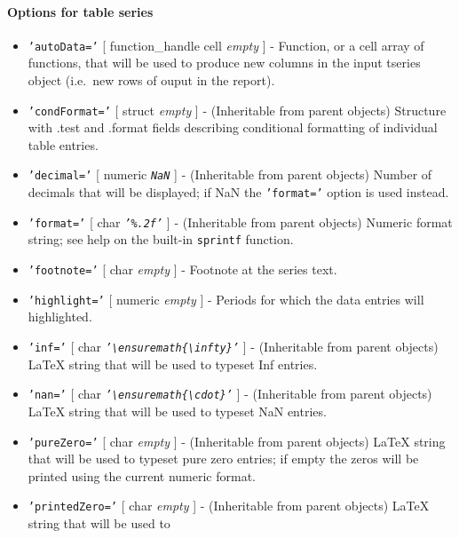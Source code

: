 \paragraph{Options for table series}\label{options-for-table-series}

\begin{itemize}
\item
  \texttt{'autoData='} {[} function\_handle \textbar{} cell \textbar{}
  \emph{empty} {]} - Function, or a cell array of functions, that will
  be used to produce new columns in the input tseries object (i.e.~new
  rows of ouput in the report).
\item
  \texttt{'condFormat='} {[} struct \textbar{} \emph{empty} {]} -
  (Inheritable from parent objects) Structure with .test and .format
  fields describing conditional formatting of individual table entries.
\item
  \texttt{'decimal='} {[} numeric \textbar{} \emph{\texttt{NaN}} {]} -
  (Inheritable from parent objects) Number of decimals that will be
  displayed; if NaN the \texttt{'format='} option is used instead.
\item
  \texttt{'format='} {[} char \textbar{} \emph{\texttt{'\%.2f'}} {]} -
  (Inheritable from parent objects) Numeric format string; see help on
  the built-in \texttt{sprintf} function.
\item
  \texttt{'footnote='} {[} char \textbar{} \emph{empty} {]} - Footnote
  at the series text.
\item
  \texttt{'highlight='} {[} numeric \textbar{} \emph{empty} {]} -
  Periods for which the data entries will highlighted.
\item
  \texttt{'inf='} {[} char \textbar{}
  \emph{\texttt{'\textbackslash{}ensuremath\{\textbackslash{}infty\}'}}
  {]} - (Inheritable from parent objects) LaTeX string that will be used
  to typeset Inf entries.
\item
  \texttt{'nan='} {[} char \textbar{}
  \emph{\texttt{'\textbackslash{}ensuremath\{\textbackslash{}cdot\}'}}
  {]} - (Inheritable from parent objects) LaTeX string that will be used
  to typeset NaN entries.
\item
  \texttt{'pureZero='} {[} char \textbar{} \emph{empty} {]} -
  (Inheritable from parent objects) LaTeX string that will be used to
  typeset pure zero entries; if empty the zeros will be printed using
  the current numeric format.
\item
  \texttt{'printedZero='} {[} char \textbar{} \emph{empty} {]} -
  (Inheritable from parent objects) LaTeX string that will be used to

\end{itemize}
